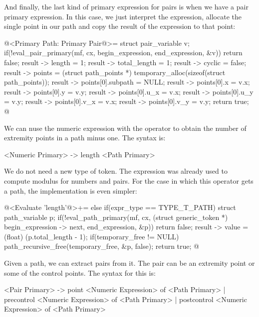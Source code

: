 And finally, the last kind of primary expression for pairs is when we
have a pair primary expression. In this case, we just interpret the
expression, allocate the single point in our path and copy the result
of the expression to that point:

\iniciocodigo
@<Primary Path: Primary Pair@>=
struct pair_variable v;
if(!eval_pair_primary(mf, cx, begin_expression, end_expression, &v))
  return false;
result -> length = 1;
result -> total_length = 1;
result -> cyclic = false;
result -> points = (struct path_points *)
                     temporary_alloc(sizeof(struct path_points));
result -> points[0].subpath = NULL;
result -> points[0].x = v.x;
result -> points[0].y = v.y;
result -> points[0].u_x = v.x;
result -> points[0].u_y = v.y;
result -> points[0].v_x = v.x;
result -> points[0].v_y = v.y;
return true;
@
\fimcodigo


We can nuse the numeric expression with the
operator  to obtain the number of extremity points
in a path minus one. The syntax is:

\alinhaverbatim
<Numeric Primary> -> length <Path Primary>
\alinhanormal

We do not need a new type of token. The expression 
was already used to compute modulus for numbers and pairs. For the
case in which this operator gets a path, the implementation is even
simpler:

\iniciocodigo
@<Evaluate 'length'@>+=
else if(expr_type == TYPE_T_PATH){
  struct path_variable p;
  if(!eval_path_primary(mf, cx, (struct generic_token *)
                                begin_expression -> next, end_expression,
                                &p))
    return false;
  result -> value = (float) (p.total_length - 1);
  if(temporary_free != NULL)
    path_recursive_free(temporary_free, &p, false);
  return true;
}
@
\fimcodigo


Given a path, we can extract pairs from it. The pair can be an
extremity point or some of the control points. The syntax for this is:

\alinhaverbatim
<Pair Primary> -> point <Numeric Expression> of <Path Primary> |
                     precontrol <Numeric Expression> of <Path Primary> |
                     postcontrol <Numeric Expression> of <Path Primary>
\alinhanormal

